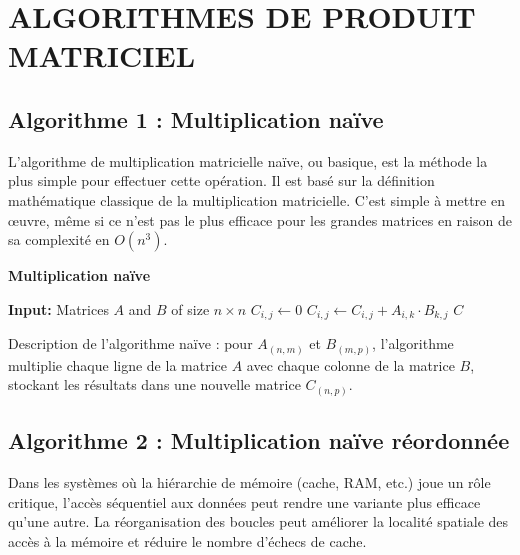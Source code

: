 \documentclass[../CSC_5RO06_TA.tex]{subfiles}
\begin{document}
\section*{ALGORITHMES DE PRODUIT MATRICIEL}

\subsection{Algorithme 1 : Multiplication naïve}

L'algorithme de multiplication matricielle naïve, ou basique, est la méthode la plus simple pour effectuer cette opération. Il est basé sur la définition mathématique classique de la multiplication matricielle. C’est simple à mettre en œuvre, même si ce n’est pas le plus efficace pour les grandes matrices en raison de sa complexité en $O(n^3)$.

\begin{algorithm}
\caption{\textbf{Multiplication naïve}}
\begin{algorithmic}[1]
    \State \textbf{Input:} Matrices $A$ and $B$ of size $n \times n$
     
         
            \State $C_{i,j} \gets 0$
             
                \State $C_{i,j} \gets C_{i,j} + A_{i,k} \cdot B_{k,j}$
            \EndFor
        \EndFor
    \EndFor
    \State \Return $C$
\end{algorithmic}
\end{algorithm}

Description de l'algorithme naïve : pour $A_{(n,m)}$ et $B_{(m,p)}$, l'algorithme multiplie chaque ligne de la matrice $A$ avec chaque colonne de la matrice $B$, stockant les résultats dans une nouvelle matrice $C_{(n,p)}$.

\subsection{Algorithme 2 : Multiplication naïve réordonnée}

Dans les systèmes où la hiérarchie de mémoire (cache, RAM, etc.) joue un rôle critique, l'accès séquentiel aux données peut rendre une variante plus efficace qu'une autre. La réorganisation des boucles peut améliorer la localité spatiale des accès à la mémoire et réduire le nombre d'échecs de cache.\\
\end{document}

